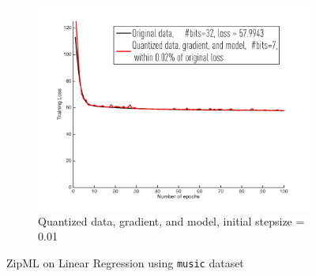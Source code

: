 \documentclass{article}
\begin{document}
\begin{figure}[h]
\begin{subfigure}[h]{.3\columnwidth}
    \includegraphics[width=\columnwidth]{lr/real/YearPredictionMSD/dgm001}
     \caption{Quantized data, gradient, and model, initial stepsize = 0.01}
     \label{subfig:musicdgm}
    \end{subfigure}
    
\caption{ZipML on Linear Regression using \texttt{music} dataset}
\label{fig:lrmusic}
\end{figure}
\end{document}
